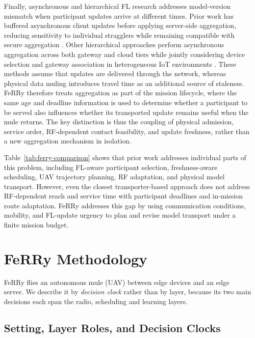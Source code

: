 \documentclass[conference]{IEEEtran}
\newcommand{\sysname}{FeRRy}
\begin{document}
Finally, asynchronous and hierarchical FL research addresses model-version mismatch when participant updates arrive at different times. Prior work has buffered asynchronous client updates before applying server-side aggregation, reducing sensitivity to individual stragglers while remaining compatible with secure aggregation \cite{nguyen2022federated}. Other hierarchical approaches perform asynchronous aggregation across both gateway and cloud tiers while jointly considering device selection and gateway association in heterogeneous IoT environments \cite{yu2023async}. These methods assume that updates are delivered through the network, whereas physical data muling introduces travel time as an additional source of staleness. FeRRy therefore treats aggregation as part of the mission lifecycle, where the same age and deadline information is used to determine whether a participant to be served also influences whether its transported update remains useful when the mule returns. The key distinction is thus the coupling of physical admission, service order, RF-dependent contact feasibility, and update freshness, rather than a new aggregation mechanism in isolation.

Table~\ref{tab:ferry-comparison} shows that prior work addresses individual parts of this problem, including FL-aware participant selection, freshness-aware scheduling, UAV trajectory planning, RF adaptation, and physical model transport. However, even the closest transporter-based approach does not address RF-dependent reach and service time with participant deadlines and in-mission route adaptation. FeRRy addresses this gap by using communication conditions, mobility, and FL-update urgency to plan and revise model transport under a finite mission budget.

\section{\sysname{} Methodology}
\label{sec:method}

\sysname{} flies an autonomous mule (UAV) between edge devices and an edge
server. We describe it by \emph{decision clock} rather than by layer, because
its two main decisions each span the radio, scheduling and learning layers.

\subsection{Setting, Layer Roles, and Decision Clocks}
\label{sec:method:roles}
\end{document}
